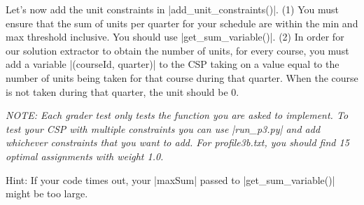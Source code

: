 \item {}
Let's now add the unit constraints in |add_unit_constraints()|. (1) You must
ensure that the sum of units per quarter for your schedule are within the min
and max threshold inclusive. You should use |get_sum_variable()|. (2) In order
for our solution extractor to obtain the number of units, for every course, you
must add a variable |(courseId, quarter)| to the CSP taking on a value equal to
the number of units being taken for that course during that quarter. When the
course is not taken during that quarter, the unit should be 0.

{\em NOTE: Each grader test only tests the function you are asked to implement.
To test your CSP with multiple constraints you can use |run_p3.py| and add
whichever constraints that you want to add. For profile3b.txt, you should find
15 optimal assignments with weight 1.0.

Hint: If your code times out, your |maxSum| passed to |get_sum_variable()| might
be too large.}
